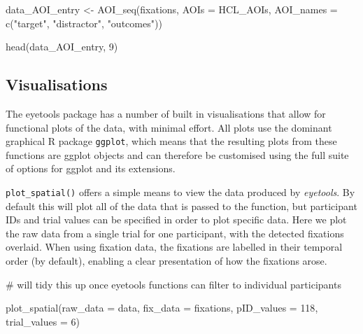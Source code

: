 \documentclass[
  man,
  floatsintext,
  longtable,
  nolmodern,
  notxfonts,
  notimes,
  colorlinks=true,linkcolor=blue,citecolor=blue,urlcolor=blue]{apa7}
\newenvironment{Shaded}{\begin{snugshade}}{\end{snugshade}}
\newcommand{\AttributeTok}[1]{\textcolor[rgb]{0.40,0.45,0.13}{#1}}
\newcommand{\CommentTok}[1]{\textcolor[rgb]{0.37,0.37,0.37}{#1}}
\newcommand{\DecValTok}[1]{\textcolor[rgb]{0.68,0.00,0.00}{#1}}
\newcommand{\FunctionTok}[1]{\textcolor[rgb]{0.28,0.35,0.67}{#1}}
\newcommand{\NormalTok}[1]{\textcolor[rgb]{0.00,0.23,0.31}{#1}}
\newcommand{\OtherTok}[1]{\textcolor[rgb]{0.00,0.23,0.31}{#1}}
\newcommand{\StringTok}[1]{\textcolor[rgb]{0.13,0.47,0.30}{#1}}
\begin{document}
\begin{Shaded}
\begin{Highlighting}[]
\NormalTok{data\_AOI\_entry }\OtherTok{\textless{}{-}} 
  \FunctionTok{AOI\_seq}\NormalTok{(fixations, }
          \AttributeTok{AOIs =}\NormalTok{ HCL\_AOIs,}
          \AttributeTok{AOI\_names =} \FunctionTok{c}\NormalTok{(}\StringTok{"target"}\NormalTok{, }\StringTok{"distractor"}\NormalTok{, }\StringTok{"outcomes"}\NormalTok{))}

\FunctionTok{head}\NormalTok{(data\_AOI\_entry, }\DecValTok{9}\NormalTok{)}
\end{Highlighting}
\end{Shaded}

\subsection{Visualisations}\label{visualisations}

The eyetools package has a number of built in visualisations that allow
for functional plots of the data, with minimal effort. All plots use the
dominant graphical R package \texttt{ggplot}, which means that the
resulting plots from these functions are ggplot objects and can
therefore be customised using the full suite of options for ggplot and
its extensions.

\texttt{plot\_spatial()} offers a simple means to view the data produced
by \emph{eyetools}. By default this will plot all of the data that is
passed to the function, but participant IDs and trial values can be
specified in order to plot specific data. Here we plot the raw data from
a single trial for one participant, with the detected fixations
overlaid. When using fixation data, the fixations are labelled in their
temporal order (by default), enabling a clear presentation of how the
fixations arose.

\begin{Shaded}
\begin{Highlighting}[]
\CommentTok{\# will tidy this up once eyetools functions can filter to individual participants}

\FunctionTok{plot\_spatial}\NormalTok{(}\AttributeTok{raw\_data =}\NormalTok{ data,}
             \AttributeTok{fix\_data =}\NormalTok{ fixations,}
             \AttributeTok{pID\_values =} \DecValTok{118}\NormalTok{,}
             \AttributeTok{trial\_values =} \DecValTok{6}\NormalTok{)}
\end{Highlighting}
\end{Shaded}
\end{document}
